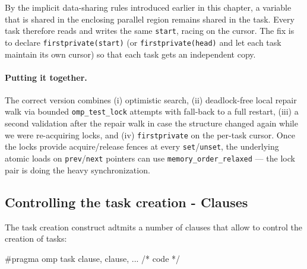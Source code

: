 By the implicit data-sharing rules introduced earlier in this chapter, a variable that is shared in the enclosing parallel region remains shared in the task. Every task therefore reads and writes the same \texttt{start}, racing on the cursor. The fix is to declare \texttt{firstprivate(start)} (or \texttt{firstprivate(head)} and let each task maintain its own cursor) so that each task gets an independent copy.

\paragraph{Putting it together.} The correct version combines (i) optimistic search, (ii) deadlock-free local repair walk via bounded \texttt{omp\_test\_lock} attempts with fall-back to a full restart, (iii) a second validation after the repair walk in case the structure changed again while we were re-acquiring locks, and (iv) \texttt{firstprivate} on the per-task cursor. Once the locks provide acquire/release fences at every \texttt{set}/\texttt{unset}, the underlying atomic loads on \texttt{prev}/\texttt{next} pointers can use \texttt{memory\_order\_relaxed} --- the lock pair is doing the heavy synchronization.

\subsection{Controlling the task creation - Clauses}

The task creation construct adtmits a number of clauses that allow to control the creation of tasks:

\begin{codeblock}[language = C]
#pragma omp task clause, clause, ...
{ 
    /* code */
}
\end{codeblock}

